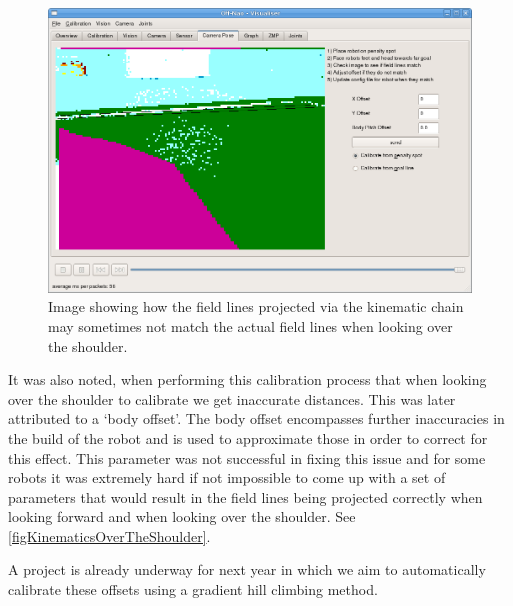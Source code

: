 \documentclass[pdftex,11pt,a4paper]{report}
\begin{document}
\begin{figure}[ht]
\centering
\includegraphics[width=1.0\textwidth]{figures/kinematicsOverTheShoulder}
\caption{Image showing how the field lines projected via the kinematic chain may sometimes not match the actual field lines when looking over the shoulder.} \label{figKinematicsOverTheShoulder}
\end{figure}


It was also noted, when performing this calibration process that when looking over the shoulder to calibrate we get inaccurate distances. This was later attributed to a `body offset'. The body offset encompasses further inaccuracies in the build of the robot and is used to approximate those in order to correct for this effect. This parameter was not successful in fixing this issue and for some robots it was extremely hard if not impossible to come up with a set of parameters that would result in the field lines being projected correctly when looking forward and when looking over the shoulder. See \autoref{figKinematicsOverTheShoulder}.

A project is already underway for next year in which we aim to automatically calibrate these offsets using a gradient hill climbing method.
\end{document}
